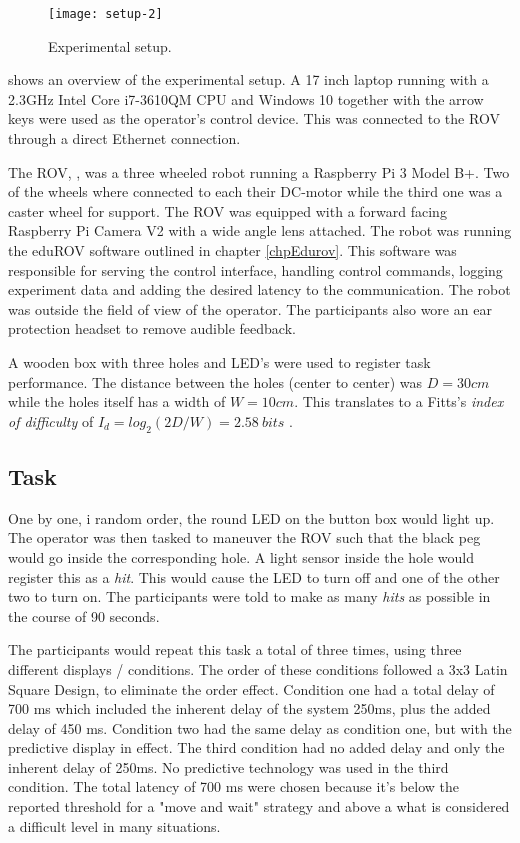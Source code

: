 \begin{figure}[h!]
    \centering
    \texttt{[image: setup-2]}
    \caption{Experimental setup.}
    \label{expsetup}
\end{figure}

 shows an overview of the experimental setup. A 17 inch laptop running with a 2.3GHz Intel Core i7-3610QM CPU and Windows 10 together with the arrow keys were used as the operator's control device. This was connected to the ROV through a direct Ethernet connection. 

The ROV, , was a three wheeled robot running a Raspberry Pi 3 Model B+. Two of the wheels where connected to each their DC-motor while the third one was a caster wheel for support. The ROV was equipped with a forward facing Raspberry Pi Camera V2 with a wide angle lens attached. The robot was running the eduROV software outlined in chapter \ref{chpEdurov}. This software was responsible for serving the control interface, handling control commands, logging experiment data and adding the desired latency to the communication. The robot was outside the field of view of the operator. The participants also wore an ear protection headset to remove audible feedback.

A wooden box with three holes and LED's were used to register task performance. The distance between the holes (center to center) was $D=30cm$ while the holes itself has a width of $W=10cm$. This translates to a Fitts's \emph{index of difficulty} of $I_d=log_2\left ( 2D/W \right )=2.58\: bits$ \citep{Fitts1954}.

\subsection{Task}\label{task}

One by one, i random order, the round LED on the button box would light up. The operator was then tasked to maneuver the ROV such that the black peg would go inside the corresponding hole. A light sensor inside the hole would register this as a \emph{hit}. This would cause the LED to turn off and one of the other two to turn on. The participants were told to make as many \emph{hits} as possible in the course of 90 seconds.

The participants would repeat this task a total of three times, using three different displays / conditions. The order of these conditions followed a 3x3 Latin Square Design, to eliminate the order effect. Condition one had a total delay of 700 ms which included the inherent delay of the system 250ms, plus the added delay of 450 ms. Condition two had the same delay as condition one, but with the predictive display in effect. The third condition had no added delay and only the inherent delay of 250ms. No predictive technology was used in the third condition. The total latency of 700 ms were chosen because it's below the reported threshold for a "move and wait" strategy \citep{Chen2007} and above a what is considered a difficult level in many situations.

